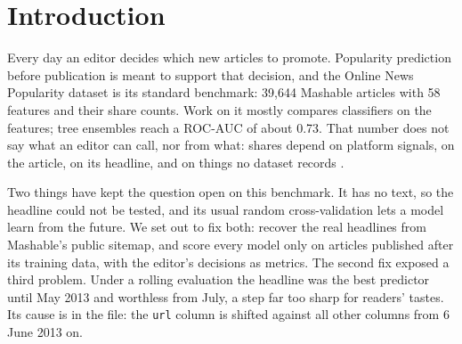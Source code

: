 \documentclass[10pt,a4paper,twocolumn]{article}
\begin{document}
\section{Introduction}
Every day an editor decides which new articles to promote. Popularity prediction before publication is meant to
support that decision, and the Online News Popularity dataset \citep{fernandes2015} is its standard benchmark:
39{,}644 Mashable articles with 58 features and their share counts. Work on it mostly compares classifiers on
the features; tree ensembles reach a ROC-AUC of about 0.73. That number does not say what an editor can call, nor
from what: shares depend on platform signals, on the article, on its headline, and on things no dataset records
\citep{salganik2006,martin2016,hofman2017}.

Two things have kept the question open on this benchmark. It has no text, so the headline could not be tested, and its usual
random cross-validation lets a model learn from the future. We set out to fix both: recover the real headlines
from Mashable's public sitemap, and score every model only on articles published after its training data, with
the editor's decisions as metrics. The second fix exposed a third problem. Under a rolling evaluation the headline
was the best predictor until May 2013 and worthless from July, a step far too sharp for readers' tastes.
Its cause is in the file: the \texttt{url} column is shifted against all other columns from 6 June 2013 on.
\end{document}
